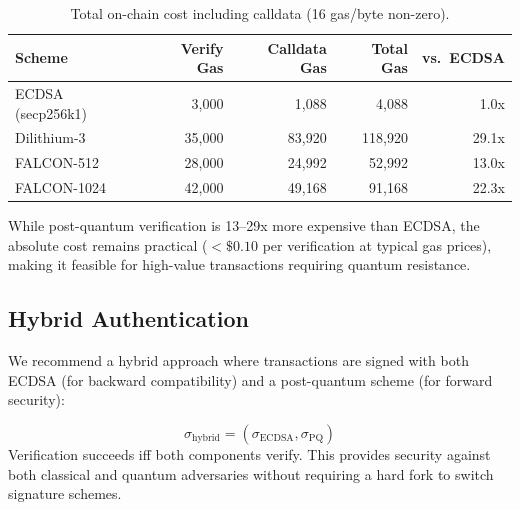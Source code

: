 \begin{table}[H]
\centering
\caption{Total on-chain cost including calldata (16 gas/byte non-zero).}
\label{tab:pq_total}
\begin{tabular}{lrrrr}
\toprule
\textbf{Scheme} & \textbf{Verify Gas} & \textbf{Calldata Gas} & \textbf{Total Gas} & \textbf{vs.\ ECDSA} \\
\midrule
ECDSA (secp256k1) & 3,000 & 1,088 & 4,088 & 1.0x \\
Dilithium-3 & 35,000 & 83,920 & 118,920 & 29.1x \\
FALCON-512 & 28,000 & 24,992 & 52,992 & 13.0x \\
FALCON-1024 & 42,000 & 49,168 & 91,168 & 22.3x \\
\bottomrule
\end{tabular}
\end{table}

While post-quantum verification is 13--29x more expensive than ECDSA, the absolute cost remains practical ($< \$0.10$ per verification at typical gas prices), making it feasible for high-value transactions requiring quantum resistance.

\subsection{Hybrid Authentication}

We recommend a hybrid approach where transactions are signed with both ECDSA (for backward compatibility) and a post-quantum scheme (for forward security):

\begin{definition}
\begin{equation}
    \sigma_{\text{hybrid}} = (\sigma_{\text{ECDSA}}, \sigma_{\text{PQ}})
\end{equation}
Verification succeeds iff both components verify. This provides security against both classical and quantum adversaries without requiring a hard fork to switch signature schemes.
\end{definition}

